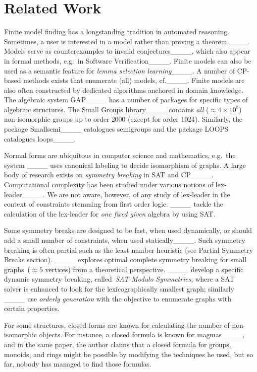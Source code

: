 \section{Related Work}
\label{sec:related}

Finite model finding has a longstanding tradition in automated
reasoning.  Sometimes, a user is interested in a model rather than
proving a theorem____. Models serve as counterexamples to
invalid conjectures____, which also appear in
formal methods, e.g.\ in Software
Verification____. Finite models can also be used as
a semantic feature for \emph{lemma selection
  learning}____.  A number of CP-based methods exists
that enumerate (all) models, cf.____.
%
Finite models are also often constructed by dedicated
algorithms anchored in domain knowledge. The algebraic system
GAP____  has a number of packages for specific types of algebraic
structures. The Small Groups library____ contains
\emph{all} ($\approx 4\times 10^8$) non-isomorphic groups up to order 2000 (except for order 1024).
Similarly, the package Smallsemi____ catalogues semigroups and the package LOOPS
catalogues loops____.

Normal forms are ubiquitous in computer science and mathematics, e.g.\
the system \nauty____ uses canonical labeling to decide
isomorphism of graphs.
%
A large body of research exists on \emph{symmetry breaking} in SAT and
CP____.  Computational complexity has been studied
under various notions of lex-leader____. We
are not aware, however, of any study of lex-leader in the context of constraints
stemming from first order logic.
%
____ tackle the calculation of the lex-leader for
\emph{one fixed given} algebra by using SAT\@.

%
Some symmetry breaks are designed to
be fast, when used dynamically, or should add a small number of constraints,
when used statically____.
%
Such symmetry breaking is often partial such as the least number
heuristic (see Partial Symmetry Breaks section).  ____
explores optimal complete symmetry breaking for small
graphs~($\approx 5$ vertices) from a theoretical perspective.
____ develop a specific dynamic symmetry breaking,
called~\emph{SAT Modulo Symmetries}, where a SAT solver is enhanced to
look for the lexicographically smallest graph; similarly ____ use \emph{orderly generation}
with the objective to enumerate graphs with certain properties.
%

For some structures, closed forms are known for calculating the number
of non-isomorphic objects.  For instance, a closed formula is known for
magmas____, and in the same paper, the author claims that a
closed formula for groups, monoids, and rings might be possible by modifying
the techniques he used, but so far, nobody has managed to find those formulas.
%

